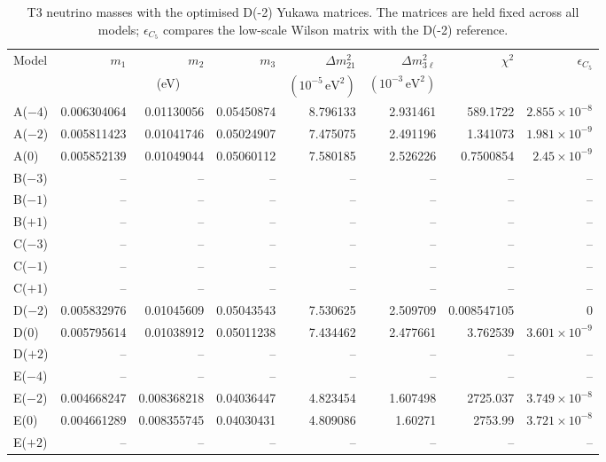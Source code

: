 \begin{table}[p]
\centering
\caption{T3 neutrino masses with the optimised D(-2) Yukawa matrices. The matrices are held fixed across all models; $\epsilon_{C_5}$ compares the low-scale Wilson matrix with the D(-2) reference.}
\label{tab:appC_Dm2_masses}
\begingroup
\footnotesize
\setlength{\tabcolsep}{3.2pt}
\begin{tabular}{lrrrrrrr}
\hline
Model & $m_1$ & $m_2$ & $m_3$ & $\Delta m^2_{21}$ & $\Delta m^2_{3\ell}$ & $\chi^2$ & $\epsilon_{C_5}$ \\
 & \multicolumn{3}{c}{(eV)} & $(10^{-5}\,\mathrm{eV}^2)$ & $(10^{-3}\,\mathrm{eV}^2)$ &  &  \\
\hline
A($-4$) & 0.006304064 & 0.01130056 & 0.05450874 & 8.796133 & 2.931461 & 589.1722 & $2.855\times10^{-8}$ \\
A($-2$) & 0.005811423 & 0.01041746 & 0.05024907 & 7.475075 & 2.491196 & 1.341073 & $1.981\times10^{-9}$ \\
A($0$) & 0.005852139 & 0.01049044 & 0.05060112 & 7.580185 & 2.526226 & 0.7500854 & $2.45\times10^{-9}$ \\
B($-3$) & -- & -- & -- & -- & -- & -- & -- \\
B($-1$) & -- & -- & -- & -- & -- & -- & -- \\
B($+1$) & -- & -- & -- & -- & -- & -- & -- \\
C($-3$) & -- & -- & -- & -- & -- & -- & -- \\
C($-1$) & -- & -- & -- & -- & -- & -- & -- \\
C($+1$) & -- & -- & -- & -- & -- & -- & -- \\
D($-2$) & 0.005832976 & 0.01045609 & 0.05043543 & 7.530625 & 2.509709 & 0.008547105 & 0 \\
D($0$) & 0.005795614 & 0.01038912 & 0.05011238 & 7.434462 & 2.477661 & 3.762539 & $3.601\times10^{-9}$ \\
D($+2$) & -- & -- & -- & -- & -- & -- & -- \\
E($-4$) & -- & -- & -- & -- & -- & -- & -- \\
E($-2$) & 0.004668247 & 0.008368218 & 0.04036447 & 4.823454 & 1.607498 & 2725.037 & $3.749\times10^{-8}$ \\
E($0$) & 0.004661289 & 0.008355745 & 0.04030431 & 4.809086 & 1.60271 & 2753.99 & $3.721\times10^{-8}$ \\
E($+2$) & -- & -- & -- & -- & -- & -- & -- \\
\hline
\end{tabular}
\endgroup
\end{table}
